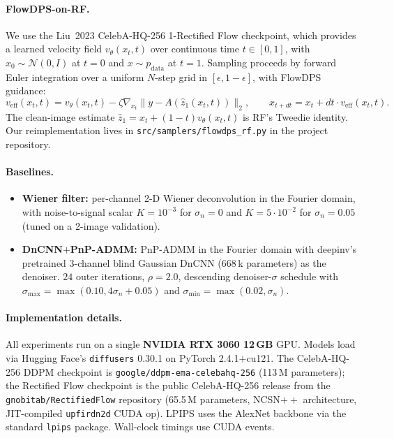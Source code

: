 \documentclass{article}
\begin{document}
\paragraph{FlowDPS-on-RF.}
We use the Liu~2023 CelebA-HQ-256 1-Rectified Flow checkpoint, which
provides a learned velocity field $v_\theta(x_t, t)$ over continuous time
$t \in [0,1]$, with $x_0 \sim \mathcal{N}(0, I)$ at $t = 0$ and $x \sim p_\text{data}$
at $t = 1$. Sampling proceeds by forward Euler integration over a uniform
$N$-step grid in $[\epsilon, 1 - \epsilon]$, with FlowDPS guidance:
\begin{equation}
  v_\text{eff}(x_t, t) = v_\theta(x_t, t) - \zeta \nabla_{x_t} \| y - A(\hat z_1(x_t, t)) \|_2,
  \qquad
  x_{t + dt} = x_t + dt \cdot v_\text{eff}(x_t, t).
\end{equation}
The clean-image estimate $\hat z_1 = x_t + (1-t) v_\theta(x_t, t)$ is RF's
Tweedie identity. Our reimplementation lives in
\verb|src/samplers/flowdps_rf.py| in the project repository.

\paragraph{Baselines.}
\begin{itemize}[leftmargin=*,itemsep=2pt]
  \item \textbf{Wiener filter:} per-channel 2-D Wiener deconvolution in
    the Fourier domain, with noise-to-signal scalar $K = 10^{-3}$ for
    $\sigma_n = 0$ and $K = 5 \cdot 10^{-2}$ for $\sigma_n = 0.05$ (tuned
    on a 2-image validation).
  \item \textbf{DnCNN$+$PnP-ADMM:} PnP-ADMM in the Fourier domain with
    deepinv's pretrained 3-channel blind Gaussian DnCNN (668\,k
    parameters) as the denoiser. $24$ outer iterations, $\rho = 2.0$,
    descending denoiser-$\sigma$ schedule with $\sigma_\text{max} =
    \max(0.10, 4\sigma_n + 0.05)$ and $\sigma_\text{min} =
    \max(0.02, \sigma_n)$.
\end{itemize}

\paragraph{Implementation details.}
All experiments run on a single \textbf{NVIDIA RTX 3060 12\,GB} GPU.
Models load via Hugging Face's \texttt{diffusers} 0.30.1 on PyTorch
2.4.1$+$cu121. The CelebA-HQ-256 DDPM checkpoint is
\texttt{google/ddpm-ema-celebahq-256} (113\,M parameters); the
Rectified Flow checkpoint is the public CelebA-HQ-256 release from the
\texttt{gnobitab/RectifiedFlow} repository (65.5\,M parameters, NCSN$++$
architecture, JIT-compiled \texttt{upfirdn2d} CUDA op). LPIPS uses the
AlexNet backbone via the standard \texttt{lpips} package. Wall-clock
timings use CUDA events.
\end{document}

